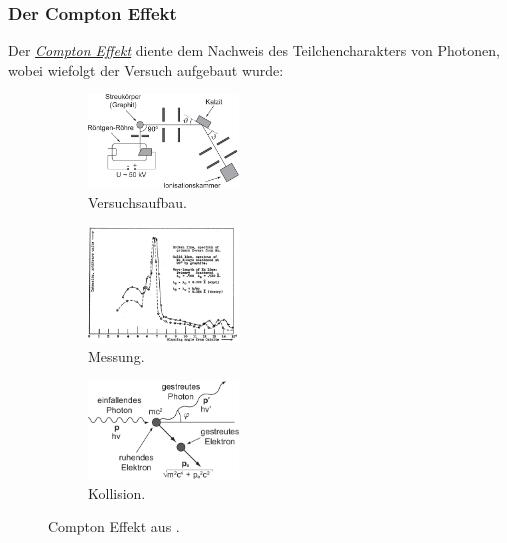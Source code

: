 \documentclass{article}
\begin{document}
    \subsubsection*{Der Compton Effekt}\label{subsubsec:ComptonEffekt}
        Der \href{https://de.wikipedia.org/wiki/Compton-Effekt}{\emph{Compton Effekt}} diente dem Nachweis des Teilchencharakters von Photonen, wobei wiefolgt der Versuch aufgebaut wurde:
        \begin{figure}[H]
            \centering
            \begin{subfigure}[b]{0.3\textwidth}
                \centering
                \includegraphics[width=4cm]{Bilddateien/ComptonAufbau.png}
                \caption{Versuchsaufbau.}
            \end{subfigure}
            \hspace{1cm}
            \begin{subfigure}[b]{0.3\textwidth}
                \centering
                \includegraphics[width=4cm]{Bilddateien/ComptonEffektMessung.png}
                \caption{Messung.}
            \end{subfigure}
            \hspace{1cm}
            \begin{subfigure}[b]{0.3\textwidth}
                \centering
                \includegraphics[width=4cm]{Bilddateien/ComptonKollision.png}
                \caption{Kollision.}
                \label{subfig:ComptonKollision}
            \end{subfigure}
            \caption{Compton Effekt aus \cite{ethz:ImpulsPhoton}.}
        \end{figure}
\end{document}
